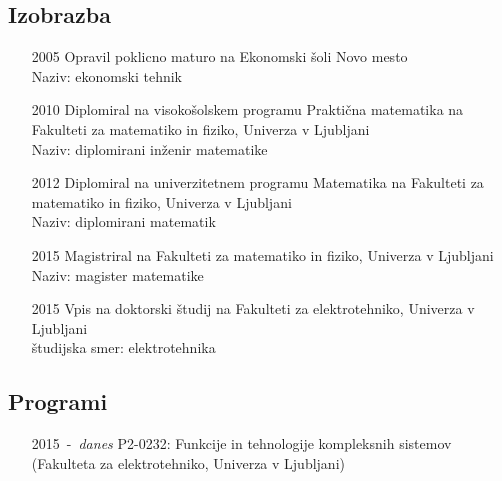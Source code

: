 \documentclass[a4paper,twoside,11pt]{article}
\begin{document}
	\subsection*{Izobrazba}
	\begin{itemize}[align=left, itemsep=-0.1cm, leftmargin=1cm, labelwidth=*]
		\item[2005] Opravil poklicno maturo na Ekonomski šoli Novo mesto \\ Naziv: ekonomski tehnik
		\item[2010] Diplomiral na visokošolskem programu Praktična matematika na Fakulteti za matematiko in fiziko, Univerza v Ljubljani \\ Naziv: diplomirani inženir matematike
		\item[2012] Diplomiral na univerzitetnem programu Matematika na Fakulteti za matematiko in fiziko, Univerza v Ljubljani \\ Naziv: diplomirani matematik
		\item[2015] Magistriral na Fakulteti za matematiko in fiziko, Univerza v Ljubljani \\ Naziv: magister matematike
		\item[2015] Vpis na doktorski študij na Fakulteti za elektrotehniko, Univerza v Ljubljani \\ študijska smer: elektrotehnika
	\end{itemize}
	
	\subsection*{Programi}
	\begin{itemize}[align=left, itemsep=-0.1cm, leftmargin=2.5cm, labelwidth=*]
		\item[2015~-~\textit{danes}] P2-0232: Funkcije in tehnologije kompleksnih sistemov (Fakulteta za elektrotehniko, Univerza v Ljubljani)
	\end{itemize}
	

	
	
	\newpage
\end{document}
